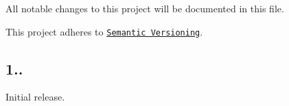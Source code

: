 All notable changes to this project will be documented in this file.

This project adheres to \href{http://semver.org/}{\tt Semantic Versioning}.

\subsection*{1..}


\begin{DoxyItemize}
\item Initial release. 
\end{DoxyItemize}